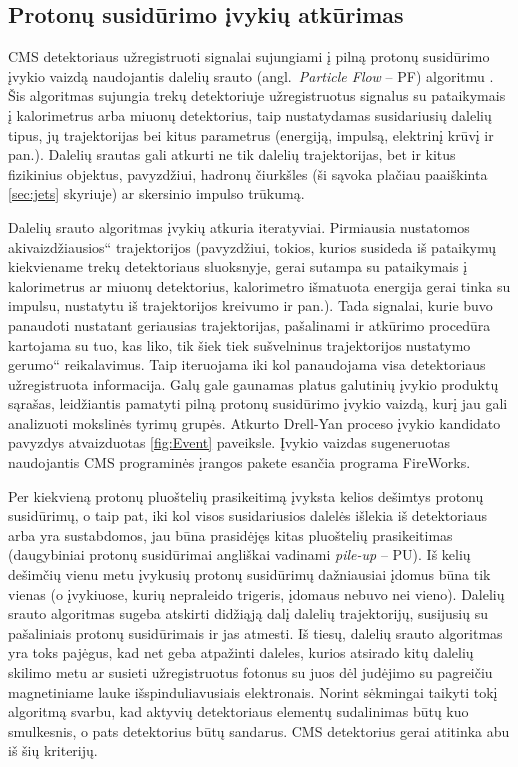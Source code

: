 \documentclass[a4paper, 12pt, oneside]{article}
\newcommand{\ltq}[1]{{\quotedblbase{}#1\textquotedblleft{}}}
\newlength\q
\begin{document}
\subsection{Protonų susidūrimo įvykių atkūrimas}
CMS detektoriaus užregistruoti signalai sujungiami į pilną protonų susidūrimo įvykio vaizdą naudojantis
dalelių srauto (angl.\ \textit{Particle Flow} -- PF) algoritmu \cite{ParticleFlow}.
Šis algoritmas sujungia trekų detektoriuje užregistruotus signalus su pataikymais į kalorimetrus arba miuonų
detektorius, taip nustatydamas susidariusių dalelių tipus, jų trajektorijas bei kitus parametrus
(energiją, impulsą, elektrinį krūvį ir pan.).
Dalelių srautas gali atkurti ne tik dalelių trajektorijas, bet ir kitus fizikinius objektus, pavyzdžiui,
hadronų čiurkšles (ši sąvoka plačiau paaiškinta \ref{sec:jets} skyriuje) ar skersinio impulso trūkumą.

Dalelių srauto algoritmas įvykių atkuria iteratyviai.
Pirmiausia nustatomos \ltq{akivaizdžiausios} trajektorijos (pavyzdžiui, tokios, kurios susideda iš pataikymų
kiekviename trekų detektoriaus sluoksnyje, gerai sutampa su pataikymais į kalorimetrus ar miuonų detektorius,
kalorimetro išmatuota energija gerai tinka su impulsu, nustatytu iš trajektorijos kreivumo ir pan.).
Tada signalai, kurie buvo panaudoti nustatant geriausias trajektorijas, pašalinami ir atkūrimo procedūra
kartojama su tuo, kas liko, tik šiek tiek sušvelninus trajektorijos nustatymo \ltq{gerumo} reikalavimus.
Taip iteruojama iki kol panaudojama visa detektoriaus užregistruota informacija.
Galų gale gaunamas platus galutinių įvykio produktų sąrašas, leidžiantis pamatyti pilną protonų susidūrimo įvykio vaizdą,
kurį jau gali analizuoti mokslinės tyrimų grupės.
Atkurto Drell-Yan proceso įvykio kandidato pavyzdys atvaizduotas \ref{fig:Event} paveiksle.
Įvykio vaizdas sugeneruotas naudojantis CMS programinės įrangos pakete esančia programa FireWorks.

Per kiekvieną protonų pluoštelių prasikeitimą įvyksta kelios dešimtys protonų susidūrimų, o taip pat, iki kol
visos susidariusios dalelės išlekia iš detektoriaus arba yra sustabdomos, jau būna prasidėjęs kitas pluoštelių
prasikeitimas (daugybiniai protonų susidūrimai angliškai vadinami \textit{pile-up} -- PU).
Iš kelių dešimčių vienu metu įvykusių protonų susidūrimų dažniausiai įdomus būna tik vienas (o įvykiuose, kurių
nepraleido trigeris, įdomaus nebuvo nei vieno).
Dalelių srauto algoritmas sugeba atskirti didžiąją dalį dalelių trajektorijų, susijusių su pašaliniais
protonų susidūrimais ir jas atmesti.
Iš tiesų, dalelių srauto algoritmas yra toks pajėgus, kad net geba atpažinti daleles, kurios atsirado kitų dalelių skilimo metu
ar susieti užregistruotus fotonus su juos dėl judėjimo su pagreičiu magnetiniame lauke išspinduliavusiais elektronais.
Norint sėkmingai taikyti tokį algoritmą svarbu, kad aktyvių detektoriaus elementų sudalinimas būtų kuo smulkesnis,
o pats detektorius būtų sandarus.
CMS detektorius gerai atitinka abu iš šių kriterijų.
\end{document}
